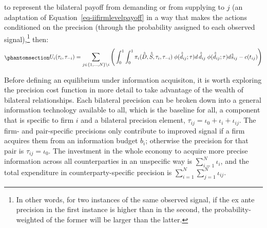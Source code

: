 \documentclass[
]{article}
\theoremstyle{definition}
\theoremstyle{plain}
\theoremstyle{remark}
\begin{document}
to represent the bilateral payoff from demanding or from supplying to
\(j\) (an adaptation of Equation~\ref{eq-iifirmlevelpayoff} in a way
that makes the actions conditioned on the precision (through the
probability assigned to each observed signal),\footnote{In other words,
  for two instances of the same observed signal, if the ex ante
  precision in the first instance is higher than in the second, the
  probability-weighted of the former will be larger than the latter.}
then: \begin{equation}\phantomsection\label{eq-iiendfirmlevelpayoff}{
\begin{split}
U_i(\tau_i, \tau_{-i}) = \sum_{j \in \{1, \dots, N\}\setminus i} \Bigg( \int_0^1 \int_0^1 \pi_i(\hat{\tilde{D}}, \hat{\tilde{S}}, \tau_i, \tau_{-i}) \; \phi(\hat{\tilde{d}}_{ij}; \tau) d\, \hat{\tilde{d}}_{ij}  \; \phi(\hat{\tilde{d}}_{ij}; \tau) d \hat{\tilde{s}}_{ij} - c(t_{ij}) \Bigg)
\end{split}
}\end{equation}

Before defining an equilibrium under information acquisiton, it is worth
exploring the precision cost function in more detail to take advantage
of the wealth of bilateral relationships. Each bilateral precision can
be broken down into a general information technology available to all,
which is the baseline for all, a component that is specific to firm
\(i\) and a bilateral precision element,
\(\tau_{ij} = \iota_0 + \iota_{i} + \iota_{ij}\). The firm- and
pair-specific precisions only contribute to improved signal if a firm
acquires them from an information budget \(b_i\); otherwise the
precision for that pair is \(\tau_{ij} = \iota_0\). The investment in
the whole economy to acquire more precise information across all
counterparties in an unspecific way is \(\sum_{i=1}^N \iota_i\), and the
total expenditure in counterparty-specific precision is
\(\sum_{i=1}^N \sum_{j=1}^N \iota_{ij}\).
\end{document}
